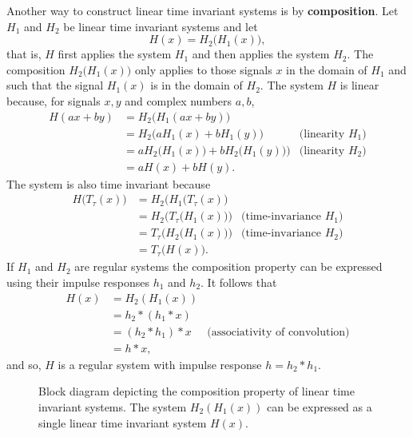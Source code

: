 \documentclass[11pt,a4paper]{book}
\theoremstyle{plain}
\numberwithin{equation}{section}
\newcommand{\term}{\textbf}
\begin{document}
Another way to construct linear time invariant systems is by \term{composition}.  Let $H_1$ and $H_2$ be linear time invariant systems and let
\[
H(x) = H_2\big(H_1(x)\big),
\]
that is, $H$ first applies the system $H_1$ and then applies the system $H_2$.  The composition $H_2\big(H_1(x)\big)$ only applies to those signals $x$ in the domain of $H_1$ and such that the signal $H_1(x)$ is in the domain of $H_2$.  The system $H$ is linear because, for signals $x,y$ and complex numbers $a,b$,
\begin{align*}
H(ax + by) &= H_2\big(H_1(ax + by)\big) \\
&= H_2\big(aH_1(x) + bH_1(y)\big)  &\text{(linearity $H_1$)}\\
&= aH_2\big(H_1(x)) + bH_2\big(H_1(y))\big)  &\text{(linearity $H_2$)} \\
&= aH(x) + bH(y).
\end{align*}
The system is also time invariant because
\begin{align*}
H\big(T_\tau(x)\big) &= H_2\big(H_1(T_\tau(x)\big) \\
&= H_2\big(T_\tau\big(H_1(x)\big)\big)  &\text{(time-invariance $H_1$)}\\
&= T_\tau\big(H_2\big(H_1(x)\big)\big)  &\text{(time-invariance $H_2$)} \\
&= T_\tau\big(H(x)\big).
\end{align*}
If $H_1$ and $H_2$ are regular systems the composition property can be expressed using their impulse responses $h_1$ and $h_2$.  It follows that
\begin{align*}
H(x) &= H_2(H_1(x)) \\
&= h_2 * (h_1 * x) \\
&= (h_2* h_1) * x &\text{(associativity of convolution)} \\
&= h * x,
\end{align*}
and so, $H$ is a regular system with impulse response $h = h_2 * h_1$.  %

\begin{figure}
\centering
{}
\caption{Block diagram depicting the composition property of linear time invariant systems. The system $H_2(H_1(x))$ can be expressed as a single linear time invariant system $H(x)$.}\label{blockdiag:compositionlti}
\end{figure}
\end{document}
